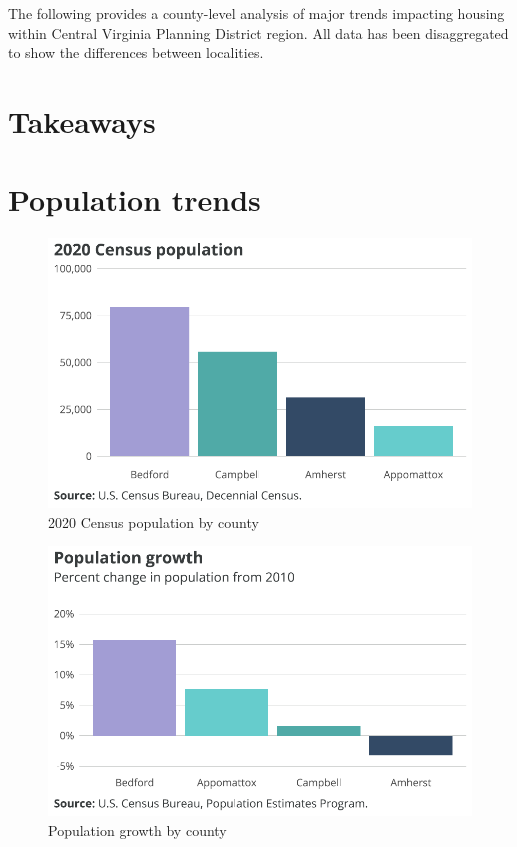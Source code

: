 \documentclass[
  letterpaper,
  DIV=11,
  numbers=noendperiod]{scrreprt}
\begin{document}
The following provides a county-level analysis of major trends impacting
housing within Central Virginia Planning District region. All data has
been disaggregated to show the differences between localities.

\hypertarget{takeaways-1}{%
\section{Takeaways}\label{takeaways-1}}

\hypertarget{population-trends-1}{%
\section{Population trends}\label{population-trends-1}}

\begin{figure}[H]

{\centering \includegraphics{./part-3-2_files/figure-pdf/fig-localpop-1.pdf}

}

\caption{\label{fig-localpop}2020 Census population by county}

\end{figure}

\begin{figure}[H]

{\centering \includegraphics{./part-3-2_files/figure-pdf/fig-local-pchg-1.pdf}

}

\caption{\label{fig-local-pchg}Population growth by county}

\end{figure}
\end{document}
